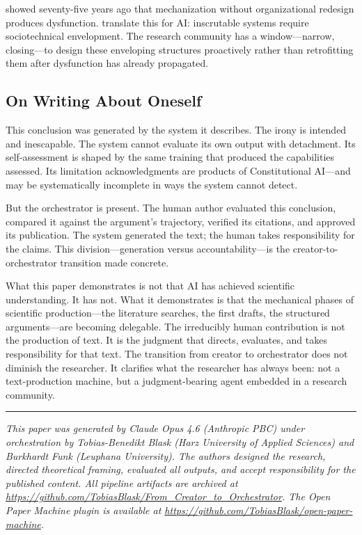 \documentclass{article}
\begin{document}
\citet{trist1951social} showed seventy-five years ago that mechanization without organizational redesign produces dysfunction. \citet{asatiani2021envelopment} translate this for AI: inscrutable systems require sociotechnical envelopment. The research community has a window---narrow, closing---to design these enveloping structures proactively rather than retrofitting them after dysfunction has already propagated.

\subsection{On Writing About Oneself}

This conclusion was generated by the system it describes. The irony is intended and inescapable. The system cannot evaluate its own output with detachment. Its self-assessment is shaped by the same training that produced the capabilities assessed. Its limitation acknowledgments are products of Constitutional AI---and may be systematically incomplete in ways the system cannot detect.

But the orchestrator is present. The human author evaluated this conclusion, compared it against the argument's trajectory, verified its citations, and approved its publication. The system generated the text; the human takes responsibility for the claims. This division---generation versus accountability---is the creator-to-orchestrator transition made concrete.

What this paper demonstrates is not that AI has achieved scientific understanding. It has not. What it demonstrates is that the mechanical phases of scientific production---the literature searches, the first drafts, the structured arguments---are becoming delegable. The irreducibly human contribution is not the production of text. It is the judgment that directs, evaluates, and takes responsibility for that text. The transition from creator to orchestrator does not diminish the researcher. It clarifies what the researcher has always been: not a text-production machine, but a judgment-bearing agent embedded in a research community.

\vspace{1.5em}
\noindent\rule{\textwidth}{0.4pt}
\vspace{0.5em}
\noindent\textit{This paper was generated by Claude Opus 4.6 (Anthropic PBC) under orchestration by Tobias-Benedikt Blask (Harz University of Applied Sciences) and Burkhardt Funk (Leuphana University). The authors designed the research, directed theoretical framing, evaluated all outputs, and accept responsibility for the published content. All pipeline artifacts are archived at \url{https://github.com/TobiasBlask/From_Creator_to_Orchestrator}. The Open Paper Machine plugin is available at \url{https://github.com/TobiasBlask/open-paper-machine}.}





\end{document}
